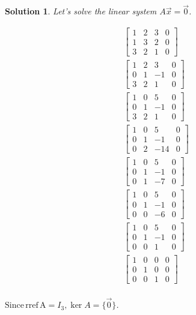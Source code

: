 \documentclass{article}
\newtheorem*{solution}{Solution}
\newcommand{\rref}[1]{\mathrm{rref \, #1}}
\begin{document}
\begin{solution}
Let's solve the linear system $A\vec{x} = \vec{0}$.

\begin{align*}
\left[ \begin{array}{ccc|c}1 & 2 & 3 & 0 \\ 1 & 3 & 2 & 0 \\ 3 & 2 & 1 & 0 \end{array} \right] \\
\left[ \begin{array}{ccc|c}1 & 2 & 3 & 0 \\ 0 & 1 & -1 & 0 \\ 3 & 2 & 1 & 0 \end{array} \right] \\
\left[ \begin{array}{ccc|c}1 & 0 & 5 & 0 \\ 0 & 1 & -1 & 0 \\ 3 & 2 & 1 & 0 \end{array} \right] \\
\left[ \begin{array}{ccc|c}1 & 0 & 5 & 0 \\ 0 & 1 & -1 & 0 \\ 0 & 2 & -14 & 0 \end{array} \right] \\
\left[ \begin{array}{ccc|c}1 & 0 & 5 & 0 \\ 0 & 1 & -1 & 0 \\ 0 & 1 & -7 & 0 \end{array} \right] \\
\left[ \begin{array}{ccc|c}1 & 0 & 5 & 0 \\ 0 & 1 & -1 & 0 \\ 0 & 0 & -6 & 0 \end{array} \right] \\
\left[ \begin{array}{ccc|c}1 & 0 & 5 & 0 \\ 0 & 1 & -1 & 0 \\ 0 & 0 & 1 & 0 \end{array} \right] \\
\left[ \begin{array}{ccc|c}1 & 0 & 0 & 0 \\ 0 & 1 & 0 & 0 \\ 0 & 0 & 1 & 0 \end{array} \right] \\
\end{align*}

$\mathrm{Since } \, \rref{A} = I_{3}, \ker A = \{\vec{0}\}$.

\end{solution}
\end{document}
